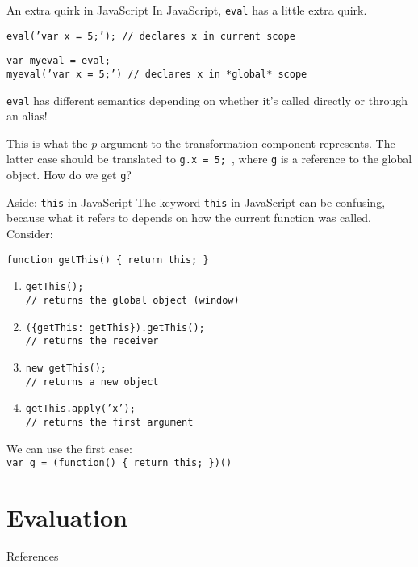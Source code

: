 \documentclass{beamer}
\begin{document}
\begin{frame}{An extra quirk in JavaScript}
In JavaScript, {\tt eval} has a little extra quirk. \vspace{5mm}

{\tt eval('var x = 5;'); // declares x in current scope} \vspace{5mm}

{\tt var myeval = eval;} \\
{\tt myeval('var x = 5;') // declares x in *global* scope} \vspace{5mm}

{\tt eval} has different semantics depending on whether it's called
directly or through an alias! \vspace{5mm}

This is what the $p$ argument to the transformation component represents.
The latter case should be translated to {\tt g.x = 5; }, where {\tt g} is
a reference to the global object. How do we get {\tt g}?
\end{frame}

\begin{frame}{Aside: {\tt this} in JavaScript}
The keyword {\tt this} in JavaScript can be confusing, because what it
refers to depends on how the current function was called. Consider: \vspace{2mm}

{\tt function getThis() \{ return this; \}}
\vspace{2mm}

\begin{enumerate}
\item {\tt getThis();} \\
{\tt // returns the global object (window)}
\item {\tt (\{getThis: getThis\}).getThis();} \\
{\tt // returns the receiver}
\item {\tt new getThis();} \\
{\tt // returns a new object}
\item {\tt getThis.apply('x');} \\
{\tt // returns the first argument }
\end{enumerate}
We can use the first case: \\ 
{\tt var g = (function() \{ return this; \})()}
\end{frame}
             
\section{Evaluation}

\begin{frame}{References}

{\footnotesize
}
\end{frame}
\end{document}
